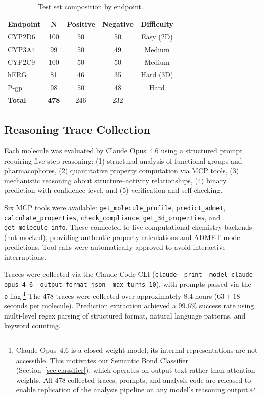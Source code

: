 \documentclass[11pt]{article}
\begin{document}
\begin{table}[h]
\centering
\caption{Test set composition by endpoint.}
\label{tab:test_set}
\begin{tabular}{lcccc}
\toprule
\textbf{Endpoint} & \textbf{N} & \textbf{Positive} & \textbf{Negative} & \textbf{Difficulty} \\
\midrule
CYP2D6  & 100 & 50 & 50 & Easy (2D) \\
CYP3A4  & 99  & 50 & 49 & Medium \\
CYP2C9  & 100 & 50 & 50 & Medium \\
hERG    & 81  & 46 & 35 & Hard (3D) \\
P-gp    & 98  & 50 & 48 & Hard \\
\midrule
\textbf{Total} & \textbf{478} & 246 & 232 & \\
\bottomrule
\end{tabular}
\end{table}

\subsection{Reasoning Trace Collection}
\label{sec:trace_collection}

Each molecule was evaluated by Claude Opus~4.6 \citep{anthropic2025mcp} using a structured prompt requiring five-step reasoning: (1) structural analysis of functional groups and pharmacophores, (2) quantitative property computation via MCP tools, (3) mechanistic reasoning about structure--activity relationships, (4) binary prediction with confidence level, and (5) verification and self-checking.

Six MCP tools were available: \texttt{get\_molecule\_profile}, \texttt{predict\_admet}, \texttt{calculate\_properties}, \texttt{check\_compliance}, \texttt{get\_3d\_properties}, and \texttt{get\_molecule\_info}. These connected to live computational chemistry backends (not mocked), providing authentic property calculations and ADMET model predictions. Tool calls were automatically approved to avoid interactive interruptions.

Traces were collected via the Claude Code CLI (\texttt{claude --print --model claude-opus-4-6 --output-format json --max-turns 10}), with prompts passed via the \texttt{-p} flag.\footnote{Claude Opus~4.6 is a closed-weight model; its internal representations are not accessible. This motivates our Semantic Bond Classifier (Section~\ref{sec:classifier}), which operates on output text rather than attention weights. All 478 collected traces, prompts, and analysis code are released to enable replication of the analysis pipeline on any model's reasoning output.} The 478 traces were collected over approximately 8.4 hours ($63 \pm 18$ seconds per molecule). Prediction extraction achieved a 99.6\% success rate using multi-level regex parsing of structured format, natural language patterns, and keyword counting.
\end{document}
